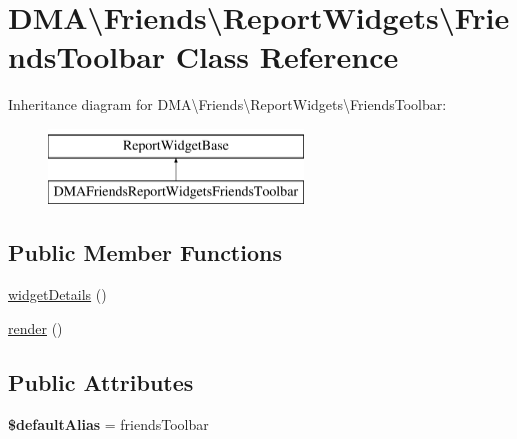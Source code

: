 \hypertarget{classDMA_1_1Friends_1_1ReportWidgets_1_1FriendsToolbar}{}\section{D\+M\+A\textbackslash{}Friends\textbackslash{}Report\+Widgets\textbackslash{}Friends\+Toolbar Class Reference}
\label{classDMA_1_1Friends_1_1ReportWidgets_1_1FriendsToolbar}
Inheritance diagram for D\+M\+A\textbackslash{}Friends\textbackslash{}Report\+Widgets\textbackslash{}Friends\+Toolbar\+:\begin{figure}[H]
\begin{center}
\leavevmode
\includegraphics[height=2.000000cm]{d4/d8c/classDMA_1_1Friends_1_1ReportWidgets_1_1FriendsToolbar}
\end{center}
\end{figure}
\subsection*{Public Member Functions}
\begin{DoxyCompactItemize}
\item 
\hyperlink{classDMA_1_1Friends_1_1ReportWidgets_1_1FriendsToolbar_a56951946e166c46353910da4a5c399a1}{widget\+Details} ()
\item 
\hyperlink{classDMA_1_1Friends_1_1ReportWidgets_1_1FriendsToolbar_a5fb3de1ff5dd5186e068dcf8c5e8d154}{render} ()
\end{DoxyCompactItemize}
\subsection*{Public Attributes}
\begin{DoxyCompactItemize}
\item 
\hypertarget{classDMA_1_1Friends_1_1ReportWidgets_1_1FriendsToolbar_aabef17c5a99fc5f66554a91dd2cde59d}{}{\bfseries \$default\+Alias} = \textquotesingle{}friends\+Toolbar\textquotesingle{}\label{classDMA_1_1Friends_1_1ReportWidgets_1_1FriendsToolbar_aabef17c5a99fc5f66554a91dd2cde59d}

\end{DoxyCompactItemize}


